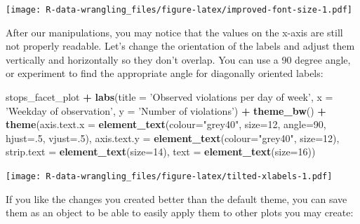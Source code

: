 \documentclass[]{book}
\newenvironment{Shaded}{\begin{snugshade}}{\end{snugshade}}
\newcommand{\KeywordTok}[1]{\textcolor[rgb]{0.13,0.29,0.53}{\textbf{#1}}}
\newcommand{\DataTypeTok}[1]{\textcolor[rgb]{0.13,0.29,0.53}{#1}}
\newcommand{\DecValTok}[1]{\textcolor[rgb]{0.00,0.00,0.81}{#1}}
\newcommand{\StringTok}[1]{\textcolor[rgb]{0.31,0.60,0.02}{#1}}
\newcommand{\OperatorTok}[1]{\textcolor[rgb]{0.81,0.36,0.00}{\textbf{#1}}}
\newcommand{\NormalTok}[1]{#1}
\theoremstyle{definition}
\theoremstyle{definition}
\theoremstyle{definition}
\theoremstyle{remark}
\begin{document}
\texttt{[image: R-data-wrangling\_files/figure-latex/improved-font-size-1.pdf]}

After our manipulations, you may notice that the values on the x-axis
are still not properly readable. Let's change the orientation of the
labels and adjust them vertically and horizontally so they don't
overlap. You can use a 90 degree angle, or experiment to find the
appropriate angle for diagonally oriented labels:

\begin{Shaded}
\begin{Highlighting}[]
\NormalTok{stops_facet_plot }\OperatorTok{+}
\StringTok{  }\KeywordTok{labs}\NormalTok{(}\DataTypeTok{title =} \StringTok{'Observed violations per day of week'}\NormalTok{,}
         \DataTypeTok{x =} \StringTok{'Weekday of observation'}\NormalTok{,}
         \DataTypeTok{y =} \StringTok{'Number of violations'}\NormalTok{) }\OperatorTok{+}
\StringTok{  }\KeywordTok{theme_bw}\NormalTok{() }\OperatorTok{+}\StringTok{ }
\StringTok{  }\KeywordTok{theme}\NormalTok{(}\DataTypeTok{axis.text.x =} \KeywordTok{element_text}\NormalTok{(}\DataTypeTok{colour=}\StringTok{"grey40"}\NormalTok{, }\DataTypeTok{size=}\DecValTok{12}\NormalTok{, }\DataTypeTok{angle=}\DecValTok{90}\NormalTok{, }\DataTypeTok{hjust=}\NormalTok{.}\DecValTok{5}\NormalTok{, }\DataTypeTok{vjust=}\NormalTok{.}\DecValTok{5}\NormalTok{),}
        \DataTypeTok{axis.text.y =} \KeywordTok{element_text}\NormalTok{(}\DataTypeTok{colour=}\StringTok{"grey40"}\NormalTok{, }\DataTypeTok{size=}\DecValTok{12}\NormalTok{),}
        \DataTypeTok{strip.text =} \KeywordTok{element_text}\NormalTok{(}\DataTypeTok{size=}\DecValTok{14}\NormalTok{),}
        \DataTypeTok{text =} \KeywordTok{element_text}\NormalTok{(}\DataTypeTok{size=}\DecValTok{16}\NormalTok{))}
\end{Highlighting}
\end{Shaded}

\texttt{[image: R-data-wrangling\_files/figure-latex/tilted-xlabels-1.pdf]}

If you like the changes you created better than the default theme, you
can save them as an object to be able to easily apply them to other
plots you may create:
\end{document}
